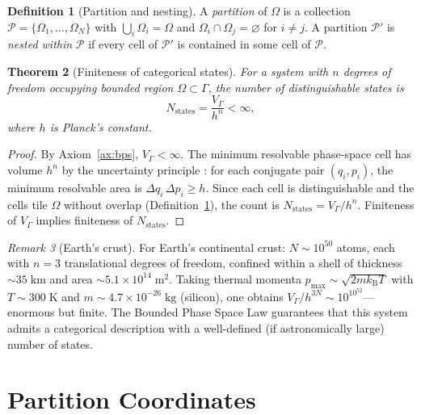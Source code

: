 \documentclass[10pt,twocolumn]{article}
\newtheorem{theorem}{Theorem}[section]
\theoremstyle{definition}
\newtheorem{definition}[theorem]{Definition}
\theoremstyle{remark}
\newtheorem{remark}[theorem]{Remark}
\newcommand{\kB}{k_{\mathrm{B}}}
\begin{document}
\begin{definition}[Partition and nesting]\label{def:partition}
A \emph{partition} of $\Omega$ is a collection
$\mathcal{P}=\{\Omega_1,\dots,\Omega_N\}$ with
$\bigcup_{i}\Omega_i=\Omega$ and
$\Omega_i\cap\Omega_j=\varnothing$ for $i\ne j$.  A partition
$\mathcal{P}'$ is \emph{nested within} $\mathcal{P}$ if every
cell of $\mathcal{P}'$ is contained in some cell of
$\mathcal{P}$.
\end{definition}

\begin{theorem}[Finiteness of categorical states]
\label{thm:finite}
For a system with $n$ degrees of freedom occupying bounded
region $\Omega\subset\Gamma$, the number of distinguishable
states is
\begin{equation}\label{eq:Nstates}
  N_{\mathrm{states}} = \frac{V_\Gamma}{h^{n}} < \infty,
\end{equation}
where $h$ is Planck's constant.
\end{theorem}

\begin{proof}
By Axiom~\ref{ax:bps}, $V_\Gamma<\infty$.  The minimum
resolvable phase-space cell has volume $h^n$ by the
uncertainty principle \citep{Heisenberg1927}: for each
conjugate pair $(q_i,p_i)$, the minimum resolvable area is
$\Delta q_i\,\Delta p_i \ge h$.  Since each cell is
distinguishable and the cells tile $\Omega$ without overlap
(Definition~\ref{def:partition}), the count is
$N_{\mathrm{states}}=V_\Gamma/h^n$.  Finiteness of $V_\Gamma$
implies finiteness of $N_{\mathrm{states}}$.
\end{proof}

\begin{remark}[Earth's crust]
For Earth's continental crust: $N\sim 10^{50}$ atoms, each
with $n=3$ translational degrees of freedom, confined within
a shell of thickness $\sim 35\;\mathrm{km}$ and area $\sim
5.1\times 10^{14}\;\mathrm{m^2}$.  Taking thermal momenta
$p_{\max}\sim\sqrt{2m\kB T}$ with $T\sim 300\;\mathrm{K}$ and
$m\sim 4.7\times 10^{-26}\;\mathrm{kg}$ (silicon), one obtains
$V_\Gamma/h^{3N}\sim 10^{10^{52}}$---enormous but finite.
The Bounded Phase Space Law guarantees that this system admits
a categorical description with a well-defined (if
astronomically large) number of states.
\end{remark}

\section{Partition Coordinates}\label{sec:partition}
\end{document}

